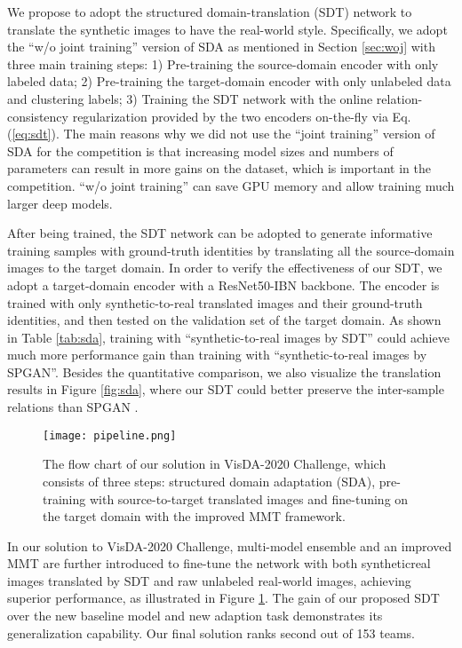 \documentclass[journal]{IEEEtran}
\begin{document}
We propose to adopt the structured domain-translation (SDT) network to translate the synthetic images to have the real-world style.
Specifically, we adopt the ``w/o joint training'' version of SDA as mentioned in Section \ref{sec:woj} with three main training steps:
1) Pre-training the source-domain encoder with only labeled data;
2) Pre-training the target-domain encoder with only unlabeled data and clustering labels;
3) Training the SDT network with the online relation-consistency regularization provided by the two encoders on-the-fly via Eq. (\ref{eq:sdt}). The main reasons why we did not use the ``joint training'' version of SDA for the competition is that increasing model sizes and numbers of parameters can result in more gains on the dataset, which is important in the competition. ``w/o joint training'' can save GPU memory and allow training much larger deep models.


After being trained, the SDT network can be adopted to generate informative training samples with ground-truth identities by translating all the source-domain images to the target domain.
In order to verify the effectiveness of our SDT, we adopt a target-domain encoder with a ResNet50-IBN backbone.
The encoder is trained with only synthetic-to-real translated images and their ground-truth identities, and then tested on the validation set of the target domain.
As shown in Table \ref{tab:sda}, training with ``synthetic-to-real images by SDT'' could achieve much more performance gain than training with ``synthetic-to-real images by SPGAN''.
Besides the quantitative comparison, we also visualize the translation results in Figure \ref{fig:sda}, where our SDT could better preserve the inter-sample relations than SPGAN \cite{deng2018image}.

\begin{figure}
    \centering
    \texttt{[image: pipeline.png]}
    \caption{{The flow chart of our solution in VisDA-2020 Challenge, which consists of three steps: structured domain adaptation (SDA), pre-training with source-to-target translated images and fine-tuning on the target domain with the improved MMT framework.}}
    \label{fig:flow}
\end{figure}

In our solution to VisDA-2020 Challenge, multi-model ensemble and an improved MMT \cite{ge2020improved,ge2020mutual} are further introduced to fine-tune the network with both syntheticreal images translated by SDT and raw unlabeled real-world images, achieving superior performance, as illustrated in Figure \ref{fig:flow}. The gain of our proposed SDT over the new baseline model and new adaption task demonstrates its generalization capability.
Our final solution ranks second out of 153 teams.
\end{document}
